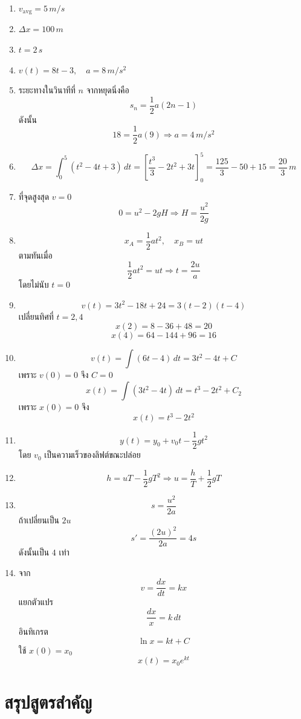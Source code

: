\documentclass[12pt,a4paper]{report}
\begin{document}
\begin{enumerate}
    \item $v_{\text{avg}}=5\,\si{m/s}$
    \item $\Delta x=100\,\si{m}$
    \item $t=2\,\si{s}$
    \item $v(t)=8t-3,\quad a=8\,\si{m/s^2}$
    \item ระยะทางในวินาทีที่ $n$ จากหยุดนิ่งคือ
    \[
    s_n=\frac{1}{2}a(2n-1)
    \]
    ดังนั้น
    \[
    18=\frac{1}{2}a(9)
    \Rightarrow a=4\,\si{m/s^2}
    \]
    \item
    \[
    \Delta x=\int_0^5 (t^2-4t+3)\,dt
    =\left[\frac{t^3}{3}-2t^2+3t\right]_0^5
    =\frac{125}{3}-50+15
    =\frac{20}{3}\,\si{m}
    \]
    \item ที่จุดสูงสุด $v=0$
    \[
    0=u^2-2gH
    \Rightarrow H=\frac{u^2}{2g}
    \]
    \item
    \[
    x_A=\frac{1}{2}at^2,\quad x_B=ut
    \]
    ตามทันเมื่อ
    \[
    \frac{1}{2}at^2=ut
    \Rightarrow t=\frac{2u}{a}
    \]
    โดยไม่นับ $t=0$
    \item
    \[
    v(t)=3t^2-18t+24=3(t-2)(t-4)
    \]
    เปลี่ยนทิศที่ $t=2,4$
    \[
    x(2)=8-36+48=20
    \]
    \[
    x(4)=64-144+96=16
    \]
    \item
    \[
    v(t)=\int(6t-4)\,dt=3t^2-4t+C
    \]
    เพราะ $v(0)=0$ จึง $C=0$
    \[
    x(t)=\int(3t^2-4t)\,dt=t^3-2t^2+C_2
    \]
    เพราะ $x(0)=0$ จึง
    \[
    x(t)=t^3-2t^2
    \]
    \item
    \[
    y(t)=y_0+v_0t-\frac{1}{2}gt^2
    \]
    โดย $v_0$ เป็นความเร็วของลิฟต์ขณะปล่อย
    \item
    \[
    h=uT-\frac{1}{2}gT^2
    \Rightarrow
    u=\frac{h}{T}+\frac{1}{2}gT
    \]
    \item
    \[
    s=\frac{u^2}{2a}
    \]
    ถ้าเปลี่ยนเป็น $2u$
    \[
    s'=\frac{(2u)^2}{2a}=4s
    \]
    ดังนั้นเป็น $4$ เท่า
    \item
    จาก
    \[
    v=\frac{dx}{dt}=kx
    \]
    แยกตัวแปร
    \[
    \frac{dx}{x}=k\,dt
    \]
    อินทิเกรต
    \[
    \ln x=kt+C
    \]
    ใช้ $x(0)=x_0$
    \[
    x(t)=x_0e^{kt}
    \]
\end{enumerate}

\section{สรุปสูตรสำคัญ}
\end{document}
